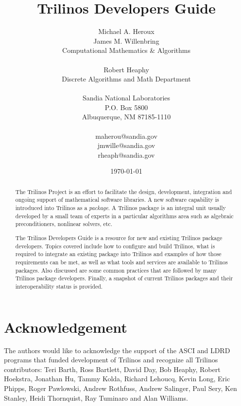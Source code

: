 \documentclass[12pt,strict]{TrilinosDevGuide}
\title{Trilinos Developers Guide}
\author{
Michael A. Heroux \\
James M. Willenbring\\
Computational Mathematics \& Algorithms \\
 \\
Robert Heaphy \\
Discrete Algorithms and Math Department \\
 \\
Sandia National Laboratories\\
P.O. Box 5800\\
Albuquerque, NM 87185-1110 \\
 \\
maherou@sandia.gov \\
jmwille@sandia.gov \\
rheaph@sandia.gov \\
}
\date{\today} %
\begin{document}
\maketitle
\setcounter{page}{3} %
\begin{abstract}

The Trilinos Project is an effort to facilitate the design, development,
integration and ongoing support of mathematical software libraries.
A new software capability is introduced into Trilinos as a {\it
package}.  A Trilinos package is an integral unit usually developed by
a small team of experts in a particular algorithms area such as
algebraic preconditioners, nonlinear solvers, etc.

The Trilinos Developers Guide is a resource for new and existing
Trilinos package developers.  Topics covered include how to configure and 
build Trilinos, what is required to integrate an existing package into Trilinos
and examples of how those requirements can be met, as well as what
tools and services are 
available to Trilinos packages.  Also discussed are some common practices that 
are followed by many Trilinos package developers.  Finally, a snapshot
of current Trilinos packages and their interoperability status
is provided.

\end{abstract}


\section*{Acknowledgement}
The authors would like to acknowledge the support of the ASCI and LDRD 
programs that funded development of Trilinos and recognize all Trilinos 
contributors: Teri Barth, Ross Bartlett, David Day, Bob Heaphy, 
Robert Hoekstra, Jonathan Hu, Tammy Kolda, Richard Lehoucq, Kevin
Long, Eric Phipps, 
Roger Pawlowski, Andrew Rothfuss, Andrew Salinger, Paul Sery, Ken
Stanley, Heidi Thornquist, Ray Tuminaro and Alan Williams.

\clearpage
\tableofcontents
\listoffigures
\listoftables

\clearpage
\end{document}
